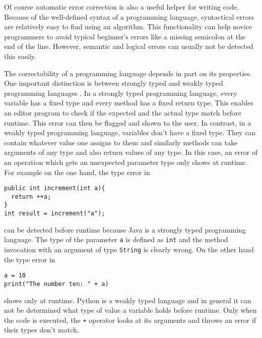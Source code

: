 Of course automatic error correction is also a useful helper for writing code. Because of the well-defined syntax of a programming language, syntactical errors are relatively easy to find using an algorithm. This functionality can help novice programmers to avoid typical beginner's errors like a missing semicolon at the end of the line. However, semantic and logical errors can usually not be detected this easily.

The correctability of a programming language depends in part on its properties. One important distinction is between strongly typed and weakly typed programming languages \cite{pl_typing}. In a strongly typed programming language, every variable has a fixed type and every method has a fixed return type. This enables an editor program to check if the expected and the actual type match before runtime. This error can then be flagged and shown to the user. In contrast, in a weakly typed programming language, variables don't have a fixed type. They can contain whatever value one assigns to them and similarly methods can take arguments of any type and also return values of any type. In this case, an error of an operation which gets an unexpected parameter type only shows at runtime. For example on the one hand, the type error in

\lstset{belowskip=3mm}
\begin{lstlisting}
public int increment(int a){
  return ++a;
}
int result = increment("a");
\end{lstlisting}

\noindent can be detected before runtime because Java is a strongly typed programming language. The type of the parameter \texttt{a} is defined as \texttt{int} and the method invocation with an argument of type \texttt{String} is clearly wrong. On the other hand the type error in

\lstset{language=Python}
\begin{lstlisting}
a = 10
print("The number ten: " + a)
\end{lstlisting}
\lstset{language=Java}
\lstset{belowskip=0mm}

shows only at runtime. Python is a weakly typed language and in general it can not be determined what type of value a variable holds before runtime. Only when the code is executed, the \texttt{+} operator looks at its arguments and throws an error if their types don't match.
